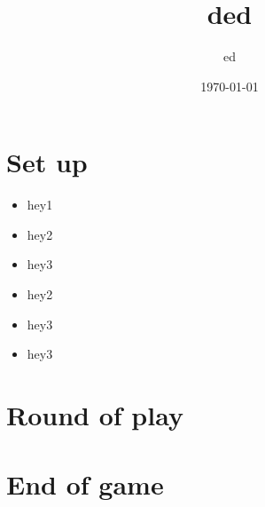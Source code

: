 \documentclass{article}%
\title{ded}%
\author{ed}%
\date{\today}%
\begin{document}
%
\pagestyle{empty}%
\normalsize%
\maketitle%
\section{ Set up
}%
\label{sec:Setup}%
\begin{itemize}%
\item%
 hey1
%
\item%
 hey2
%
\item%
 hey3
%
\end{itemize}%
\begin{itemize}%
\item%
 hey2
%
\item%
 hey3
%
\end{itemize}%
\begin{itemize}%
\item%
 hey3
%
\end{itemize}

%
\section{ Round of play
}%
\label{sec:Roundofplay}%

%
\section{ End of game}%
\label{sec:Endofgame}%

%
\end{document}
